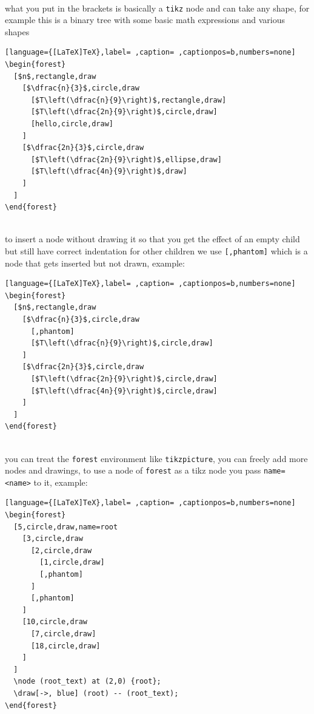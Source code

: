 \documentclass[a4paper,12pt]{article}
\begin{document}
\\[0pt]

what you put in the brackets is basically a \texttt{tikz} node and can take any shape, for example this is a binary tree with some basic math expressions and various shapes\\[0pt]

\begin{lstlisting}[language={[LaTeX]TeX},label= ,caption= ,captionpos=b,numbers=none]
\begin{forest}
  [$n$,rectangle,draw
    [$\dfrac{n}{3}$,circle,draw
      [$T\left(\dfrac{n}{9}\right)$,rectangle,draw]
      [$T\left(\dfrac{2n}{9}\right)$,circle,draw]
      [hello,circle,draw]
    ]
    [$\dfrac{2n}{3}$,circle,draw
      [$T\left(\dfrac{2n}{9}\right)$,ellipse,draw]
      [$T\left(\dfrac{4n}{9}\right)$,draw]
    ]
  ]
\end{forest}
\end{lstlisting}

\\[0pt]

to insert a node without drawing it so that you get the effect of an empty child but still have correct indentation for other children we use \texttt{[,phantom]} which is a node that gets inserted but not drawn, example:\\[0pt]

\begin{lstlisting}[language={[LaTeX]TeX},label= ,caption= ,captionpos=b,numbers=none]
\begin{forest}
  [$n$,rectangle,draw
    [$\dfrac{n}{3}$,circle,draw
      [,phantom]
      [$T\left(\dfrac{n}{9}\right)$,circle,draw]
    ]
    [$\dfrac{2n}{3}$,circle,draw
      [$T\left(\dfrac{2n}{9}\right)$,circle,draw]
      [$T\left(\dfrac{4n}{9}\right)$,circle,draw]
    ]
  ]
\end{forest}
\end{lstlisting}

\\[0pt]

you can treat the \texttt{forest} environment like \texttt{tikzpicture}, you can freely add more nodes and drawings, to use a node of \texttt{forest} as a tikz node you pass \texttt{name=<name>} to it, example:\\[0pt]

\begin{lstlisting}[language={[LaTeX]TeX},label= ,caption= ,captionpos=b,numbers=none]
\begin{forest}
  [5,circle,draw,name=root
    [3,circle,draw
      [2,circle,draw
        [1,circle,draw]
        [,phantom]
      ]
      [,phantom]
    ]
    [10,circle,draw
      [7,circle,draw]
      [18,circle,draw]
    ]
  ]
  \node (root_text) at (2,0) {root};
  \draw[->, blue] (root) -- (root_text);
\end{forest}
\end{lstlisting}
\end{document}
